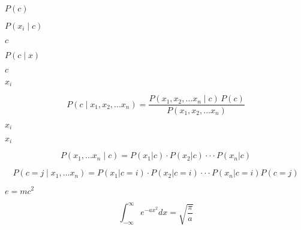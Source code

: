 \documentclass[10pt]{book}
\begin{document}
\begin{mdSnippets}
\begin{mdInlineSnippet}%
$P(c)$\end{mdInlineSnippet}%
\begin{mdInlineSnippet}%
$P(x_i \mid c)$\end{mdInlineSnippet}%
\begin{mdInlineSnippet}[4a8a08f09d37b73795649038408b5f33]%
$c$\end{mdInlineSnippet}%
\begin{mdInlineSnippet}[270623c12b8c5966e12b468eb215e89a]%
$P(c \mid x)$\end{mdInlineSnippet}%
\begin{mdInlineSnippet}[4a8a08f09d37b73795649038408b5f33]%
$c$\end{mdInlineSnippet}%
\begin{mdInlineSnippet}%
$x_i$\end{mdInlineSnippet}%
\begin{mdDisplaySnippet}%
\[%
P(c \mid x_1, x_2, ... x_n) = \frac{P(x_1,x_2, ... x_n \mid c) \, P(c)}{P(x_1,x_2, ... x_n)}
\]%
\end{mdDisplaySnippet}%
\begin{mdInlineSnippet}%
$x_i$\end{mdInlineSnippet}%
\begin{mdInlineSnippet}%
$x_i$\end{mdInlineSnippet}%
\begin{mdDisplaySnippet}[71b91f52921236d0e2b3c8ed7e65b48f]%
\[%
P(x_1, ... x_n \mid c) = P(x_1|c)⋅P(x_2|c)⋅⋅⋅P(x_n|c)
\]%
\end{mdDisplaySnippet}%
\begin{mdDisplaySnippet}[6b139d143514d13fafd495978336fa1b]%
\[%
P(c = j \mid x_1, ... x_n) = P(x_1|c = i)⋅P(x_2|c = i)⋅⋅⋅P(x_n|c = i) P(c = j)
\]%
\end{mdDisplaySnippet}%
\begin{mdInlineSnippet}[a42da9c575b4e6bcbde63bd2e43f6ce9]%
$e = mc^2$\end{mdInlineSnippet}%
\begin{mdDisplaySnippet}[5094bc6c72a97e9f9f69ae85f34ed065]%
\[%
\int_{-\infty}^\infty e^{-a x^2} d x = \sqrt{\frac{\pi}{a}} 
\]%
\end{mdDisplaySnippet}%

\end{mdSnippets}
\end{document}
